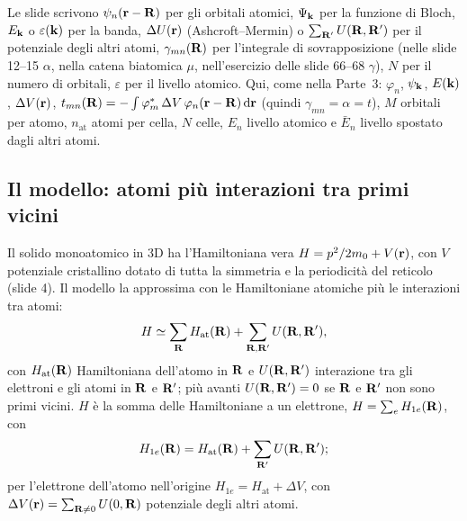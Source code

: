 \documentclass[11pt,a4paper]{article}
\begin{document}
\begin{osservazione}[notazione]
Le slide scrivono $\psi_n(\mathbf r-\mathbf R)$ per gli orbitali atomici, $\Psi_{\mathbf k}$ per la funzione di Bloch, $E_{\mathbf k}$ o $\varepsilon(\mathbf k)$ per la banda,
$\Delta U(\mathbf r)$ (Ashcroft--Mermin) o $\sum_{\mathbf R'}U(\mathbf R,\mathbf R')$ per il potenziale degli altri atomi, $\gamma_{mn}(\mathbf R)$ per l'integrale di
sovrapposizione (nelle slide 12--15 $\alpha$, nella catena biatomica $\mu$, nell'esercizio delle slide 66--68 $\gamma$), $N$ per il numero di orbitali,
$\varepsilon$ per il livello atomico. Qui, come nella Parte~3: $\varphi_n$, $\psi_{\mathbf k}$, $E(\mathbf k)$, $\Delta V(\mathbf r)$,
$t_{mn}(\mathbf R)=-\int\varphi_m^*\,\Delta V\,\varphi_n(\mathbf r-\mathbf R)\,\mathrm d\mathbf r$ (quindi $\gamma_{mn}=\alpha=t$), $M$ orbitali per atomo, $n_{\mathrm{at}}$ atomi per
cella, $N$ celle, $E_n$ livello atomico e $\bar E_n$ livello spostato dagli altri atomi.
\end{osservazione}

\subsection{Il modello: atomi più interazioni tra primi vicini}
Il solido monoatomico in 3D ha l'Hamiltoniana vera $H=p^2/2m_0+V(\mathbf r)$, con $V$ potenziale cristallino dotato di tutta la simmetria e la periodicità
del reticolo (slide 4). Il modello la approssima con le Hamiltoniane atomiche più le interazioni tra atomi:
\[
H\simeq\sum_{\mathbf R}H_{\mathrm{at}}(\mathbf R)+\sum_{\mathbf R,\mathbf R'}U(\mathbf R,\mathbf R'),
\]
con $H_{\mathrm{at}}(\mathbf R)$ Hamiltoniana dell'atomo in $\mathbf R$ e $U(\mathbf R,\mathbf R')$ interazione tra gli elettroni e gli atomi in $\mathbf R$ e $\mathbf R'$; più avanti
$U(\mathbf R,\mathbf R')=0$ se $\mathbf R$ e $\mathbf R'$ non sono primi vicini. $H$ è la somma delle Hamiltoniane a un elettrone, $H=\sum_eH_{1e}(\mathbf R)$, con
\[
H_{1e}(\mathbf R)=H_{\mathrm{at}}(\mathbf R)+\sum_{\mathbf R'}U(\mathbf R,\mathbf R');
\]
per l'elettrone dell'atomo nell'origine $H_{1e}=H_{\mathrm{at}}+\Delta V$, con $\Delta V(\mathbf r)=\sum_{\mathbf R\ne0}U(0,\mathbf R)$ potenziale degli altri atomi.
\end{document}
